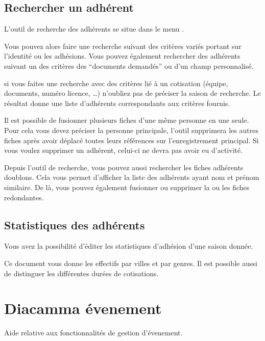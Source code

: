 \documentclass[a4paper,10pt,oneside,french]{sphinxmanual}
\begin{document}
\section{Rechercher un adhérent}
\label{\detokenize{member/member_search::doc}}\label{\detokenize{member/member_search:rechercher-un-adherent}}
L’outil de recherche des adhérents se situe dans le menu .

\noindent{}

Vous pouvez alors faire une recherche suivant des critères variés portant sur l’identité ou les adhésions.
Vous pouvez également rechercher des adhérents suivant un des critères des “documents demandés” ou d’un champ personnalisé.

 si vous faites une recherche avec des critères lié à un cotisation (équipe, documents, numéro licence, …) n’oubliez pas de préciser la saison de recherche.
Le résultat donne une liste d’adhérents correspondants aux critères fournis.

Il est possible de fusionner plusieurs fiches d’une même personne en une seule.
Pour cela vous devez préciser la personne principale, l’outil supprimera les autres fiches après avoir déplacé toutes leurs références sur l’enregistrement principal.
Si vous voulez supprimer un adhérent, celui-ci ne devra pas avoir eu d’activité.

Depuis l’outil de recherche, vous pouvez aussi rechercher les fiches adhérents doublons. Cela vous permet d’afficher la liste des adhérents ayant nom et prénom similaire.
De là, vous pouvez également fusionner ou supprimer la ou les fiches redondantes.


\section{Statistiques des adhérents}
\label{\detokenize{member/statistic::doc}}\label{\detokenize{member/statistic:statistiques-des-adherents}}
\noindent{}

Vous avez la possibilité d’éditer les statistiques d’adhésion d’une saison donnée.

Ce document vous donne les effectifs par villes et par genres. Il est possible aussi de distinguer les différentes durées de cotisations.


\chapter{Diacamma évenement}
\label{\detokenize{event/index::doc}}\label{\detokenize{event/index:diacamma-evenement}}
Aide relative aux fonctionnalités de gestion d’évenement.
\end{document}

